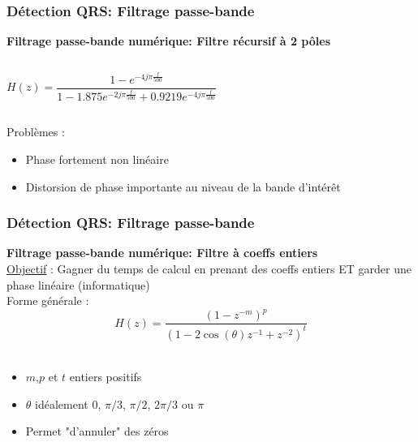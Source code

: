 \documentclass{beamer}
\begin{document}
\begin{frame}
\frametitle{Détection QRS: Filtrage passe-bande}
 \textbf{Filtrage passe-bande numérique: Filtre récursif à  2 pôles}\\
\begin{columns}
\column{60mm}
\[H(z) = \frac{1 - e^{-4 j \pi \frac{f}{500}}}{1 - 1.875 e^{-2 j \pi \frac{f}{500}} + 0.9219  e^{-4 j \pi \frac{f}{500}}} \]
\column{60mm} 
\begin{center}
\end{center}
\end{columns}
Problèmes :
\begin{itemize}
\item Phase fortement non linéaire
\item Distorsion de phase importante au niveau de la bande d'intérêt
\end{itemize}
\end{frame}




\begin{frame}
\frametitle{Détection QRS: Filtrage passe-bande}
 \textbf{Filtrage passe-bande numérique: Filtre à coeffs entiers}\\
 \vspace{0.2cm}
 \underline{Objectif} : Gagner du temps de calcul en prenant des coeffs entiers ET garder une phase linéaire (informatique) \\
 \vspace{0.3cm}
 Forme générale : 
 \[ H(z) = \frac{(1 -z^{-m})^p}{(1 - 2 \cos(\theta)z^{-1} + z^{-2})^t} \] \\
 \vspace{0.2cm}
 \begin{itemize}
 \item  $m$,$p$ et $t$ entiers positifs
 \item $\theta$ idéalement 0, $\pi/3$, $\pi/2$, $2\pi/3$ ou $\pi$
 \item Permet "d'annuler" des zéros
 \end{itemize}
\end{frame}
\end{document}
